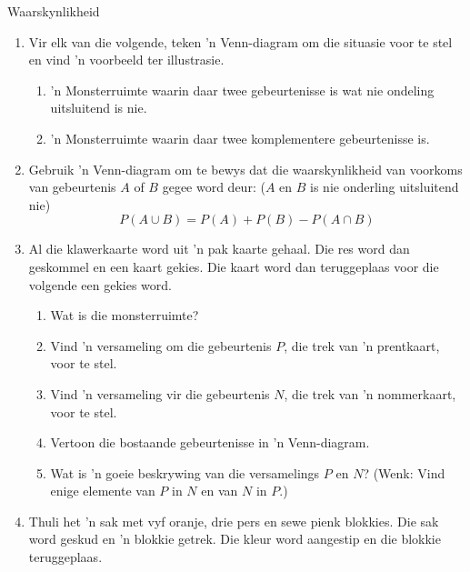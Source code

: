 \begin{eoexercises}{Waarskynlikheid}
\begin{enumerate}[itemsep=5pt, label=\textbf{\arabic*}]
    \begin{enumerate}
    \item As ek 'n lekker willekeurig kies, wat is die waarskynlikheid dit die volgende sal wees:
      \begin{enumerate}
      \item Pers of blou
      \item Swart
      \item Pers
      \end{enumerate}
    \item As daar $70$ lekkers in die fles is, hoeveel perses is daar?
    \item $\frac{1}{4}$ as die pers lekkers in b) strepe het en die res nie, hoeveel pers lekkers het strepe?
    \end{enumerate}
  \item Vir elk van die volgende, teken 'n Venn-diagram om die situasie voor te stel en vind 'n voorbeeld ter illustrasie.
    \begin{enumerate}
    \item 'n Monsterruimte waarin daar twee gebeurtenisse is wat nie ondeling uitsluitend is nie.
    \item 'n Monsterruimte waarin daar twee komplementere gebeurtenisse is.
    \end{enumerate}
  \item Gebruik 'n Venn-diagram om te bewys dat die waarskynlikheid van voorkoms van gebeurtenis  $A$ of $B$ gegee word deur: ($A$ en $B$ is nie onderling uitsluitend nie)
    \[P(A \cup B) = P(A) + P(B) - P(A \cap B)\]
  \item Al die klawerkaarte word uit 'n pak kaarte gehaal. Die res word dan geskommel en een kaart gekies. Die kaart word dan teruggeplaas voor die volgende een gekies word.
    \begin{enumerate}
    \item Wat is die monsterruimte?
    \item Vind 'n versameling om die gebeurtenis $P$, die trek van 'n prentkaart, voor te stel.
    \item Vind 'n versameling vir die gebeurtenis $N$, die trek van 'n nommerkaart, voor te stel.
    \item Vertoon die bostaande gebeurtenisse in 'n Venn-diagram.
    \item Wat is 'n goeie beskrywing van die versamelings $P$ en $N$?
      (Wenk: Vind enige elemente van $P$ in $N$ en van $N$ in $P$.)
    \end{enumerate}
  \item Thuli het 'n sak met vyf oranje, drie pers en sewe pienk blokkies. Die sak word geskud en 'n blokkie getrek. Die kleur word aangestip en die blokkie teruggeplaas.

\end{enumerate}
\end{eoexercises}
